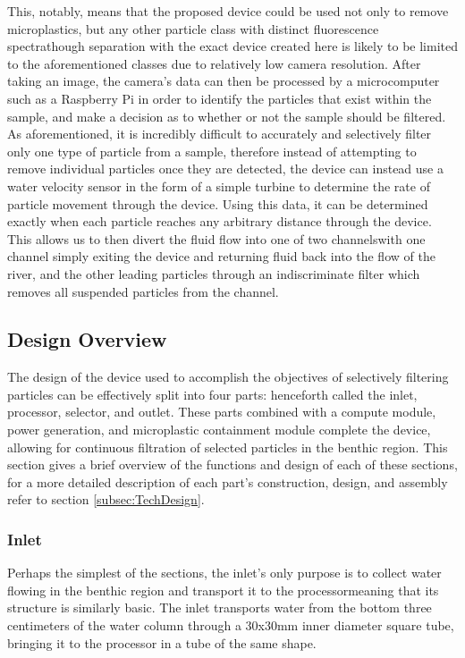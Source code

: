 \documentclass[fleqn,10pt]{SelfArx} %
\begin{document}
	This, notably, means that the proposed device could be used not only to remove microplastics, but any other particle class with distinct fluorescence spectra\textemdash though separation with the exact device created here is likely to be limited to the aforementioned classes due to relatively low camera resolution. After taking an image, the camera’s data can then be processed by a microcomputer such as a Raspberry Pi in order to identify the particles that exist within the sample, and make a decision as to whether or not the sample should be filtered. As aforementioned, it is incredibly difficult to accurately and selectively filter only one type of particle from a sample, therefore instead of attempting to remove individual particles once they are detected, the device can instead use a water velocity sensor in the form of a simple turbine to determine the rate of particle movement through the device. Using this data, it can be determined exactly when each particle reaches any arbitrary distance through the device. This allows us to then divert the fluid flow into one of two channels\textemdash with one channel simply exiting the device and returning fluid back into the flow of the river, and the other leading particles through an indiscriminate filter which removes all suspended particles from the channel. 
	
	\subsection{Design Overview}
	The design of the device used to accomplish the objectives of selectively filtering particles can be effectively split into four parts: henceforth called the inlet, processor, selector, and outlet. These parts combined with a compute module, power generation, and microplastic containment module complete the device, allowing for continuous filtration of selected particles in the \gls{benthic} region. This section gives a brief overview of the functions and design of each of these sections, for a more detailed description of each part’s construction, design, and assembly refer to  section \ref{subsec:TechDesign}.
	
	\subsubsection{Inlet}
	Perhaps the simplest of the sections, the inlet’s only purpose is to collect water flowing in the \gls{benthic} region and transport it to the processor\textemdash meaning that its structure is similarly basic. The inlet transports water from the bottom three centimeters of the water column through a 30x30mm inner diameter square tube, bringing it to the processor in a tube of the same shape.
	
\end{document}
